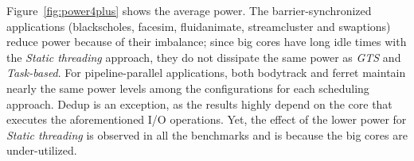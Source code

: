 Figure~\ref{fig:power4plus} shows the average power. The barrier-synchronized applications (blackscholes, facesim, fluidanimate, streamcluster and swaptions) reduce power because 
of their imbalance; since big cores have long idle times with the \emph{Static threading} approach, they do not dissipate the same power as \emph{GTS} and \emph{Task-based}.
For pipeline-parallel applications, both bodytrack and ferret maintain nearly the same 
power levels among the configurations for each scheduling approach. Dedup is an exception, as the 
results highly depend on the core that executes the aforementioned I/O operations. Yet, the 
effect of the lower power for \emph{Static threading} is observed in all the benchmarks and is because the big cores are under-utilized. %







